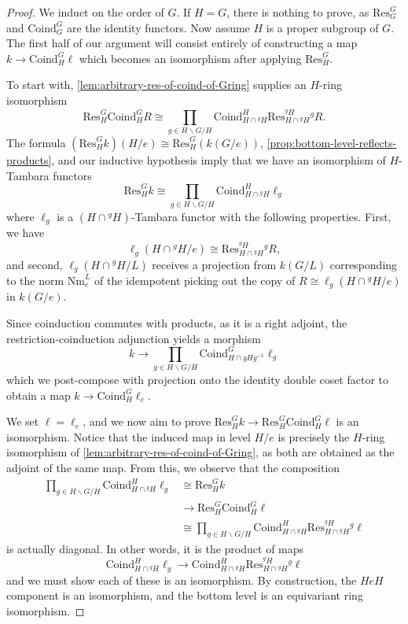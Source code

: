 \documentclass[11pt,dvipsnames]{amsart}
\theoremstyle{BoldRemark}
\begin{document}
\begin{proof}
	We induct on the order of $G$. If $H = G$, there is nothing to prove, as $\mathrm{Res}_G^G$ and $\mathrm{Coind}_G^G$ are the identity functors. Now assume $H$ is a proper subgroup of $G$. The first half of our argument will consist entirely of constructing a map $k \rightarrow \mathrm{Coind}_H^G \ell$ which becomes an isomorphism after applying $\mathrm{Res}_H^G$.
	
	 To start with, \cref{lem:arbitrary-res-of-coind-of-Gring} supplies an $H$-ring isomorphism 
\[ 
	\mathrm{Res}_H^G \mathrm{Coind}_H^G R \cong \prod_{g \in H \backslash G / H} \mathrm{Coind}_{H \cap {}^g H}^H \mathrm{Res}_{H \cap {}^g H}^{{}^g H} {}^g R .
\] 
The formula $\left( \mathrm{Res}_H^G k \right) \left( H/e \right) \cong \mathrm{Res}_H^G \left( k(G/e) \right)$, \cref{prop:bottom-level-reflects-products}, and our inductive hypothesis imply that we have an isomorphism of $H$-Tambara functors
\[ 
	\mathrm{Res}_H^G k \cong \prod_{g \in H \backslash G / H} \mathrm{Coind}_{H \cap {}^g H}^H \ell_g 
\] 
where $\ell_g$ is a $(H \cap {}^g H)$-Tambara functor with the following properties. First, we have
\[ 
	\ell_g(H \cap {}^g H/e) \cong \mathrm{Res}_{H \cap {}^g H}^{{}^g H} {}^g R \mathrm{,}
\] 
and second, $\ell_g(H \cap {}^g H/L)$ receives a projection from $k(G/L)$ corresponding to the norm $\mathrm{Nm}_e^L$ of the idempotent picking out the copy of $R \cong \ell_g(H \cap {}^g H/e)$ in $k(G/e)$.

Since coinduction commutes with products, as it is a right adjoint, the restriction-coinduction adjunction yields a morphism
\[ 
	k \rightarrow \prod_{g \in H \backslash G / H} \mathrm{Coind}_{H \cap gHg^{-1}}^G \ell_g 
\] 
which we post-compose with projection onto the identity double coset factor to obtain a map $k \rightarrow \mathrm{Coind}_H^G \ell_e$.
	
	We set $\ell = \ell_e$, and we now aim to prove $\mathrm{Res}_H^G k \rightarrow \mathrm{Res}_H^G \mathrm{Coind}_H^G \ell$ is an isomorphism. Notice that the induced map in level $H/e$ is precisely the $H$-ring isomorphism of \cref{lem:arbitrary-res-of-coind-of-Gring}, as both are obtained as the adjoint of the same map. From this, we observe that the composition 
\begin{align*} 
	\prod_{g \in H \backslash G / H} \mathrm{Coind}_{H \cap {}^g H}^H \ell_g & \cong \mathrm{Res}_H^G k \\
	& \rightarrow \mathrm{Res}_H^G \mathrm{Coind}_H^G \ell \\
	& \cong \prod_{g \in H \backslash G / H} \mathrm{Coind}_{H \cap {}^g H}^H \mathrm{Res}_{H \cap {}^g H}^{{}^g H} {}^g \ell
\end{align*}
is actually diagonal. In other words, it is the product of maps 
\[ 
	\mathrm{Coind}_{H \cap {}^g H}^H \ell_g \rightarrow \mathrm{Coind}_{H \cap {}^g H}^H \mathrm{Res}_{H \cap {}^g H}^{{}^g H} {}^g \ell
\] 
and we must show each of these is an isomorphism. By construction, the $HeH$ component is an isomorphism, and the bottom level is an equivariant ring isomorphism.


\end{proof}
\end{document}
